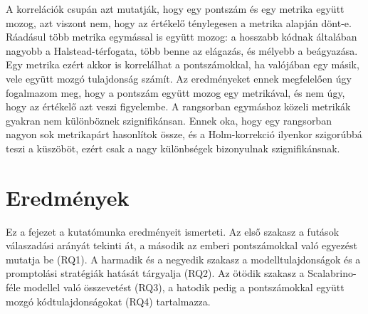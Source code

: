 \documentclass[
]{elteikthesis}[2024/04/26]
\begin{document}
A korrelációk csupán azt mutatják, hogy egy pontszám és egy metrika együtt
mozog, azt viszont nem, hogy az értékelő ténylegesen a metrika alapján dönt-e.
Ráadásul több metrika egymással is együtt mozog: a hosszabb kódnak általában
nagyobb a Halstead-térfogata, több benne az elágazás, és mélyebb a beágyazása.
Egy metrika ezért akkor is korrelálhat a pontszámokkal, ha valójában egy másik,
vele együtt mozgó tulajdonság számít. Az eredményeket ennek megfelelően úgy
fogalmazom meg, hogy a pontszám együtt mozog egy metrikával, és nem úgy, hogy az
értékelő azt veszi figyelembe. A rangsorban egymáshoz közeli metrikák gyakran
nem különböznek szignifikánsan. Ennek oka, hogy egy rangsorban nagyon sok
metrikapárt hasonlítok össze, és a Holm-korrekció ilyenkor szigorúbbá teszi a
küszöböt, ezért csak a nagy különbségek bizonyulnak szignifikánsnak.

\cleardoublepage











\chapter{Eredmények}
\label{ch:results}


Ez a fejezet a kutatómunka eredményeit ismerteti. Az első szakasz a futások
válaszadási arányát tekinti át, %
a második az emberi pontszámokkal való egyezést mutatja be (RQ1). A harmadik és
a negyedik szakasz a modelltulajdonságok és a promptolási stratégiák hatását
tárgyalja (RQ2). Az ötödik szakasz a Scalabrino-féle modellel való összevetést
(RQ3), a hatodik pedig a pontszámokkal együtt mozgó kódtulajdonságokat (RQ4)
tartalmazza.
\end{document}
